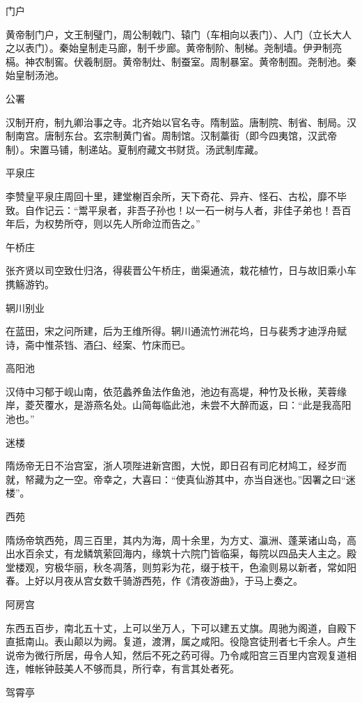 \documentclass[a4paper,12pt,UTF8,twoside]{ctexbook}
\begin{document}
    门户
    
    黄帝制门户，文王制璧门，周公制戟门、辕门（车相向以表门）、人门（立长大人之以表门）。秦始皇制走马廊，制千步廊。黄帝制阶、制梯。尧制墙。伊尹制亮槅。神农制窖。伏羲制厨。黄帝制灶、制蚕室。周制暴室。黄帝制囿。尧制池。秦始皇制汤池。
    
    公署
    
    汉制开府，制九卿治事之寺。北齐始以官名寺。隋制监。唐制院、制省、制局。汉制南宫。唐制东台。玄宗制黄门省。周制馆。汉制藁街（即今四夷馆，汉武帝制）。宋置马铺，制递站。夏制府藏文书财货。汤武制库藏。
    
    平泉庄
    
    李赞皇平泉庄周回十里，建堂榭百余所，天下奇花、异卉、怪石、古松，靡不毕致。自作记云：“鬻平泉者，非吾子孙也！以一石一树与人者，非佳子弟也！吾百年后，为权势所夺，则以先人所命泣而告之。”
    
    午桥庄
    
    张齐贤以司空致仕归洛，得裴晋公午桥庄，凿渠通流，栽花植竹，日与故旧乘小车携觞游钓。
    
    辋川别业
    
    在蓝田，宋之问所建，后为王维所得。辋川通流竹洲花坞，日与裴秀才迪浮舟赋诗，斋中惟茶铛、酒臼、经案、竹床而已。
    
    高阳池
    
    汉侍中习郁于岘山南，依范蠡养鱼法作鱼池，池边有高堤，种竹及长楸，芙蓉缘岸，菱芡覆水，是游燕名处。山简每临此池，未尝不大醉而返，曰：“此是我高阳池也。”
    
    迷楼
    
    隋炀帝无日不治宫室，浙人项陛进新宫图，大悦，即日召有司庀材鸠工，经岁而就，帑藏为之一空。帝幸之，大喜曰：“使真仙游其中，亦当自迷也。”因署之曰“迷楼”。
    
    西苑
    
    隋炀帝筑西苑，周三百里，其内为海，周十余里，为方丈、瀛洲、蓬莱诸山岛，高出水百余丈，有龙鳞筑萦回海内，缘筑十六院门皆临渠，每院以四品夫人主之。殿堂楼观，穷极华丽，秋冬凋落，则剪彩为花，缀于枝干，色渝则易以新者，常如阳春。上好以月夜从宫女数千骑游西苑，作《清夜游曲》，于马上奏之。
    
    阿房宫
    
    东西五百步，南北五十丈，上可以坐万人，下可以建五丈旗。周驰为阁道，自殿下直抵南山。表山颠以为阙。复道，渡渭，属之咸阳。役隐宫徒刑者七千余人。卢生说帝为微行所居，毋令人知，然后不死之药可得。乃令咸阳宫三百里内宫观复道相连，帷帐钟鼓美人不够而具，所行幸，有言其处者死。
    
    驾霄亭
    
\end{document}
